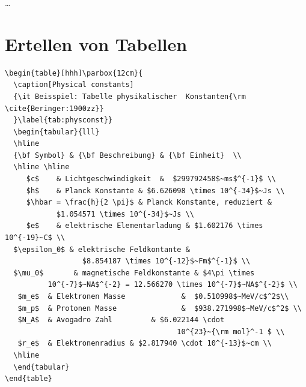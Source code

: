 \dots


\section{Ertellen von Tabellen}
\label{ch:Kapitel1:sec:Tabellen}

\begin{verbatim}
\begin{table}[hhh]\parbox{12cm}{
  \caption[Physical constants]
  {\it Beisspiel: Tabelle physikalischer  Konstanten{\rm \cite{Beringer:1900zz}}
  }\label{tab:physconst}}
  \begin{tabular}{lll}
  \hline
  {\bf Symbol} & {\bf Beschreibung} & {\bf Einheit}  \\
  \hline \hline
     $c$    & Lichtgeschwindigkeit  &  $299792458$~ms$^{-1}$ \\
     $h$    & Planck Konstante & $6.626098 \times 10^{-34}$~Js \\
     $\hbar = \frac{h}{2 \pi}$ & Planck Konstante, reduziert &
            $1.054571 \times 10^{-34}$~Js \\
     $e$    & elektrische Elementarladung & $1.602176 \times 10^{-19}~C$ \\ 
  $\epsilon_0$ & elektrische Feldkontante & 
                  $8.854187 \times 10^{-12}$~Fm$^{-1}$ \\
  $\mu_0$       & magnetische Feldkonstante & $4\pi \times 
          10^{-7}$~NA$^{-2} = 12.566270 \times 10^{-7}$~NA$^{-2}$ \\
   $m_e$  & Elektronen Masse             &  $0.510998$~MeV/c$^2$\\
   $m_p$  & Protonen Masse               &  $938.271998$~MeV/c$^2$ \\        
   $N_A$  & Avogadro Zahl         & $6.022144 \cdot 
                                        10^{23}~{\rm mol}^-1 $ \\
   $r_e$  & Elektronenradius & $2.817940 \cdot 10^{-13}$~cm \\                                     
  \hline
  \end{tabular}
\end{table}
\end{verbatim}

